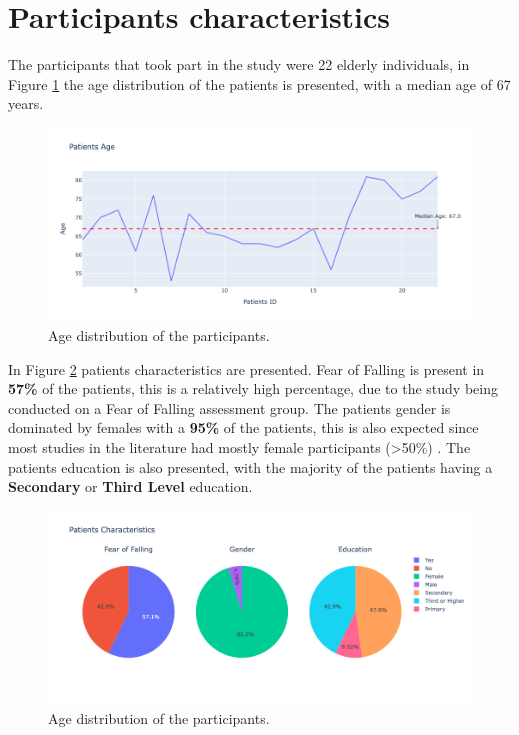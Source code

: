      \newpage

    \section{Participants characteristics}
        The participants that took part in the study were 22 elderly individuals, in Figure \ref{fig:age_distribution} the age distribution of the patients is presented, with a median age of 67 years. 
        \begin{figure}[H]
            \centering
            \includegraphics[width=1.0\textwidth]{./resources/other/patients-age.png}
            \caption{Age distribution of the participants.}
            \label{fig:age_distribution}
        \end{figure}

        In Figure \ref{fig:patients_characteristics} patients characteristics are presented. Fear of Falling is present in \textbf{57\%} of the patients, this is a relatively high percentage, due to the study being conducted on a Fear of Falling assessment group. The patients gender is dominated by females with a \textbf{95\%} of the patients, this is also expected since most studies in the literature had mostly female participants (>50\%) \cite{mackay_fear_2021}. The patients education is also presented, with the majority of the patients having a \textbf{Secondary} or \textbf{Third Level} education.
        \begin{figure}[H]
            \centering
            \includegraphics[width=1.0\textwidth]{./resources/other/patients-char.png}
            \caption{Age distribution of the participants.}
            \label{fig:patients_characteristics}
        \end{figure}

